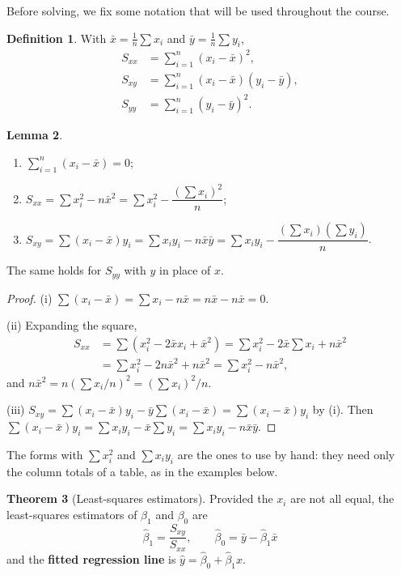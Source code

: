 \documentclass[11pt,a4paper]{article}
\numberwithin{equation}{section}
\theoremstyle{definition}
\newtheorem{thm}{Theorem}[subsection]
\newtheorem{defn}[thm]{Definition}
\newtheorem{lem}[thm]{Lemma}
\begin{document}
Before solving, we fix some notation that will be used throughout the course.

\begin{defn}
With $\bar x = \frac1n\sum x_i$ and $\bar y = \frac1n\sum y_i$,
\begin{align*}
S_{xx} &= \sum_{i=1}^n (x_i - \bar x)^2, \\
S_{xy} &= \sum_{i=1}^n (x_i - \bar x)(y_i - \bar y), \\
S_{yy} &= \sum_{i=1}^n (y_i - \bar y)^2 .
\end{align*}
\end{defn}

\begin{lem}\label{lem:sxx}
\begin{enumerate}[label=(\roman*)]
\item $\sum_{i=1}^n (x_i - \bar x) = 0$;
\item $S_{xx} = \sum x_i^2 - n\bar x^2 = \sum x_i^2 - \dfrac{\left(\sum x_i\right)^2}{n}$;
\item $S_{xy} = \sum (x_i - \bar x) y_i = \sum x_i y_i - n \bar x \bar y
       = \sum x_i y_i - \dfrac{\left(\sum x_i\right)\left(\sum y_i\right)}{n}$.
\end{enumerate}
The same holds for $S_{yy}$ with $y$ in place of $x$.
\end{lem}

\begin{proof}
(i) $\sum (x_i - \bar x) = \sum x_i - n\bar x = n\bar x - n\bar x = 0$.

(ii) Expanding the square,
\begin{align*}
S_{xx} &= \sum \left(x_i^2 - 2\bar x x_i + \bar x^2\right)
        = \sum x_i^2 - 2\bar x \sum x_i + n\bar x^2 \\
       &= \sum x_i^2 - 2n\bar x^2 + n\bar x^2
        = \sum x_i^2 - n\bar x^2 ,
\end{align*}
and $n\bar x^2 = n\left(\sum x_i / n\right)^2 = \left(\sum x_i\right)^2/n$.

(iii) $S_{xy} = \sum (x_i - \bar x) y_i - \bar y \sum (x_i - \bar x) = \sum (x_i - \bar x) y_i$
by (i). Then
$\sum (x_i - \bar x) y_i = \sum x_i y_i - \bar x \sum y_i = \sum x_i y_i - n\bar x \bar y$.
\end{proof}

The forms with $\sum x_i^2$ and $\sum x_i y_i$ are the ones to use by hand: they need only
the column totals of a table, as in the examples below.

\begin{thm}[Least-squares estimators]\label{thm:ls}
Provided the $x_i$ are not all equal, the least-squares estimators of $\beta_1$ and $\beta_0$
are
\[
\boxed{\;\hat\beta_1 = \frac{S_{xy}}{S_{xx}}, \qquad \hat\beta_0 = \bar y - \hat\beta_1 \bar x\;}
\]
and the \textbf{fitted regression line} is $\hat y = \hat\beta_0 + \hat\beta_1 x$.
\end{thm}
\end{document}
